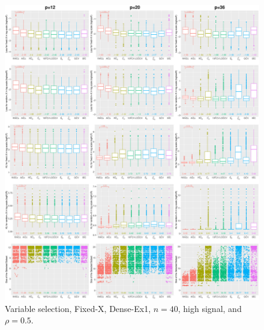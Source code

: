 \begin{figure}[!ht]
\centering
\includegraphics[width=\textwidth]{figures/supplement/fixedx/subset_selection/Dense-Ex1_n40_hsnr_rho05.eps}
\caption{Variable selection, Fixed-X, Dense-Ex1, $n=40$, high signal, and $\rho=0.5$.}
\end{figure}
\clearpage
